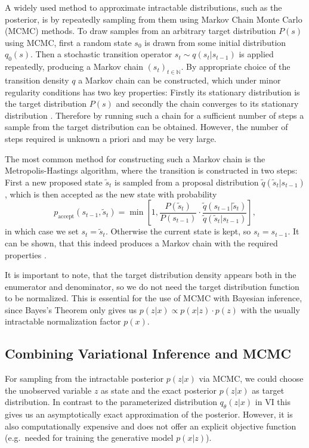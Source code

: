 A widely used method to approximate intractable distributions, such as the posterior, is by repeatedly sampling from them using Markov Chain Monte Carlo (MCMC) methods. To draw samples from an arbitrary target distribution $P(s)$ using MCMC, first a random state $s_0$ is drawn from some initial distribution $q_0(s)$. Then a stochastic transition operator $s_{t} \sim q(s_t|s_{t-1})$ is applied repeatedly, producing a Markov chain $(s_t)_{t \in \mathbb{N}}$. By appropriate choice of the transition density $q$ a Markov chain can be constructed, which under minor regularity conditions has two key properties: Firstly its stationary distribution is the target distribution $P(s)$ and secondly the chain converges to its stationary distribution \parencite{Roberts2004}. Therefore by running such a chain for a sufficient number of steps a sample from the target distribution can be obtained. However, the number of steps required is unknown a priori and may be very large.

The most common method for constructing such a Markov chain is the Metropolis-Hastings algorithm, where the transition is constructed in two steps: First a new proposed state $\tilde{s}_t$ is sampled from a proposal distribution $\tilde{q}(\tilde{s}_t|s_{t-1})$, which is then accepted as the new state with probability 
\begin{equation} \label{eq:Metropolis-Hastings}
p_{\textrm{accept}}(s_{t-1}, \tilde{s}_t) = \min \left[ 1, \frac{P(\tilde{s}_t)}{P(s_{t-1})} \cdot \frac{\tilde{q}(s_{t-1}|\tilde{s}_t)}{\tilde{q}(\tilde{s}_t|s_{t-1})} \right],
\end{equation}
in which case we set $s_t = \tilde{s}_t$. Otherwise the current state is kept, so $s_t = s_{t-1}$. It can be shown, that this indeed produces a Markov chain with the required properties \parencite{Roberts2004}. 

It is important to note, that the target distribution density appears both in the enumerator and denominator, so we do not need the target distribution function to be normalized. This is essential for the use of MCMC with Bayesian inference, since Bayes's Theorem only gives us $p(z|x) \propto p(x|z) \cdot p(z)$ with the usually intractable normalization factor $p(x)$.

\subsection{Combining Variational Inference and MCMC}
\label{sec:MCVI}
For sampling from the intractable posterior $p(z|x)$ via MCMC, we could choose the unobserved variable $z$ as state and the exact posterior $p(z|x)$ as target distribution. In contrast to the parameterized distribution $q_\theta(z|x)$ in VI this gives us an asymptotically exact approximation of the posterior. However, it is also computationally expensive and does not offer an explicit objective function (e.g.\ needed for training the generative model $p(x|z)$).

